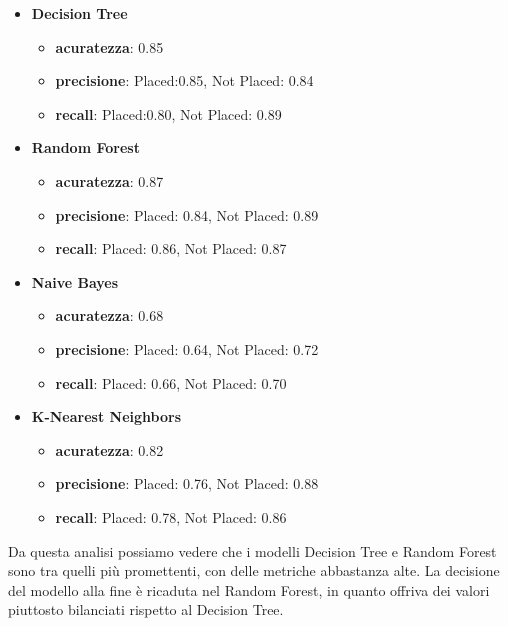 \documentclass[12pt]{article}
\begin{document}
\begin{itemize}
    \item \textbf{Decision Tree}
          \begin{itemize}
              \item \textbf{acuratezza}: 0.85
              \item \textbf{precisione}: Placed:0.85, Not Placed: 0.84
              \item \textbf{recall}: Placed:0.80, Not Placed: 0.89
          \end{itemize}
    \item \textbf{Random Forest}
          \begin{itemize}
              \item \textbf{acuratezza}: 0.87
              \item \textbf{precisione}: Placed: 0.84, Not Placed: 0.89
              \item \textbf{recall}: Placed: 0.86, Not Placed: 0.87
          \end{itemize}
    \item \textbf{Naive Bayes}
          \begin{itemize}
              \item \textbf{acuratezza}: 0.68
              \item \textbf{precisione}: Placed: 0.64, Not Placed: 0.72
              \item \textbf{recall}: Placed: 0.66, Not Placed: 0.70
          \end{itemize}
    \item \textbf{K-Nearest Neighbors}
          \begin{itemize}
              \item \textbf{acuratezza}: 0.82
              \item \textbf{precisione}: Placed: 0.76, Not Placed: 0.88
              \item \textbf{recall}: Placed: 0.78, Not Placed: 0.86
          \end{itemize}
\end{itemize}
Da questa analisi possiamo vedere che i modelli Decision Tree e Random Forest sono tra quelli più promettenti, con delle metriche abbastanza alte.
La decisione del modello alla fine è ricaduta nel Random Forest, in quanto offriva dei valori piuttosto bilanciati rispetto al Decision Tree.
\end{document}

